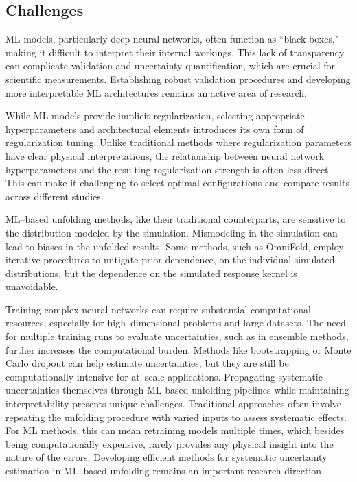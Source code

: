 \subsection{Challenges}
    ML models, particularly deep neural networks, often function as ``black boxes," making it difficult to interpret their internal workings.
    This lack of transparency can complicate validation and uncertainty quantification, which are crucial for scientific measurements.
    Establishing robust validation procedures and developing more interpretable ML architectures remains an active area of research.

    While ML models provide implicit regularization, selecting appropriate hyperparameters and architectural elements introduces its own form of regularization tuning.
    Unlike traditional methods where regularization parameters have clear physical interpretations, the relationship between neural network hyperparameters and the resulting regularization strength is often less direct.
    This can make it challenging to select optimal configurations and compare results across different studies.

    ML--based unfolding methods, like their traditional counterparts, are sensitive to the distribution modeled by the simulation.
    Mismodeling in the simulation can lead to biases in the unfolded results.
    Some methods, such as OmniFold, employ iterative procedures to mitigate prior dependence, on the individual simulated distributions, but the dependence on the simulated response kernel is unavoidable.
    
    Training complex neural networks can require substantial computational resources, especially for high--dimensional problems and large datasets.
    The need for multiple training runs to evaluate uncertainties, such as in ensemble methods, further increases the computational burden.
    Methods like bootstrapping or Monte Carlo dropout can help estimate uncertainties, but they are still be computationally intensive for at--scale applications.
    Propagating systematic uncertainties themselves through ML-based unfolding pipelines while maintaining interpretability presents unique challenges.
    Traditional approaches often involve repeating the unfolding procedure with varied inputs to assess systematic effects.
    For ML methods, this can mean retraining models multiple times, which besides being computationally expensive, rarely provides any physical insight into the nature of the errors.
    Developing efficient methods for systematic uncertainty estimation in ML--based unfolding remains an important research direction.

